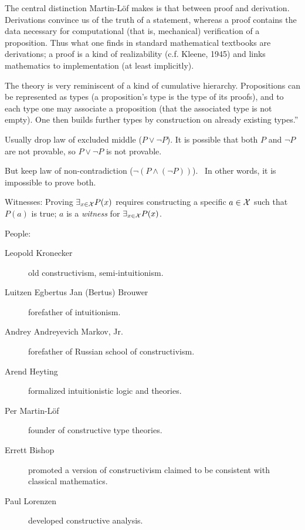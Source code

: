 The central distinction Martin-Löf makes is that 
between proof and derivation.
Derivations convince us of the truth of a statement, 
whereas a proof contains the data necessary for computational
(that is, mechanical) verification of a proposition. 
Thus what one finds in standard mathematical textbooks are
derivations; 
a proof is a kind of realizability (c.f. Kleene, 1945) and links
mathematics to implementation (at least implicitly).

The theory is very reminiscent of a kind of cumulative hierarchy. 
Propositions can be represented as types 
(a proposition's type is the type of its proofs),
and to each type one may associate a proposition 
(that the associated type is not empty). 
One then builds further types by construction on already existing
types.''

\label{sec:Constructivism_Wikipedia}

\cite{wiki:Constructivism_philosophy_of_mathematics}

Usually drop law of excluded middle 
($P \vee \lnot P$).\cite{wiki:Law_of_excluded_middle}
It is possible that both $P$ and $\lnot P$ are not provable,
so $P \vee \lnot P$ is not provable.

But keep law of non-contradiction
($\lnot ( P \wedge (\lnot P))$).~\cite{wiki:Law_of_noncontradiction}
In other words, it is impossible to prove both.

Witnesses: Proving $\exists _{x\in \mathcal{X}}P(x)$ requires
constructing a specific $a \in \mathcal{X}$ such that $P(a)$ is true; 
$a$ is a \textit{witness} for $\exists _{x\in \mathcal{X}}P(x)$.

People\cite{wiki:Constructivism_philosophy_of_mathematics}:
\begin{description}
\item[Leopold Kronecker] old constructivism, semi-intuitionism.
\item[Luitzen Egbertus Jan (Bertus) Brouwer] forefather of intuitionism.
\item[Andrey Andreyevich Markov, Jr. ] forefather of Russian school of constructivism.
\item[Arend Heyting] formalized intuitionistic logic and theories.
\item[Per Martin-Löf] founder of constructive type theories.
\item[Errett Bishop] promoted a version of constructivism 
claimed to be consistent with classical mathematics.
\item[Paul Lorenzen] developed constructive analysis.
\end{description}

